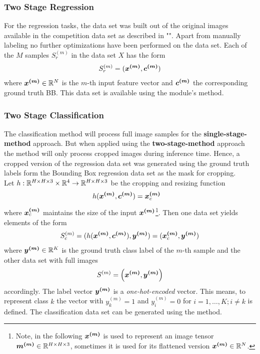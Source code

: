 \subsubsection{Two Stage Regression}
For the regression tasks, the data set was built out of the original images available in the  competition data set as described in "".
Apart from manually labeling no further optimizations have been performed on the data set.
Each of the $M$ samples $S_r^{(m)}$ in the data set $X$ has the form
\begin{align}
    S^{(m)}_r = (\bm{x^{(m)}}, \bm{c^{(m)}})
    \label{eq:regression-sample}
\end{align}
where $\bm{x^{(m)}}\in \mathbb{R}^N$ is the $m$-th input feature vector and $\bm{c^{(m)}}$ the corresponding ground truth BB.
This data set is available using the module's  method.
\subsubsection{Two Stage Classification}
The classification method will process full image samples for the \textbf{single-stage-method} approach.
But when applied using the \textbf{two-stage-method} approach the method will only process cropped images during inference time.
Hence, a cropped version of the regression data set was generated using the ground truth labels form the Bounding Box regression data set as the mask for cropping.\\
Let $h: \mathbb{R}^{H\times H\times 3} \times \mathbb{R}^{4} \rightarrow \mathbb{R}^{H\times H\times 3}$ be the cropping and resizing function
\begin{align}
    h(\bm{x^{(m)}}, \bm{c^{(m)}}) = \bm{x^{(m)}}_c\quad
    \label{eq:crop}
\end{align}
where $\bm{x^{(m)}}_c$ maintains the size of the input $\bm{x^{(m)}}$\footnote{
    Note, in the following $\bm{x^{(m)}}$ is used to represent an image tensor $\bm{m^{(m)}}\in\mathbb{R}^{H\times H\times 3}$, sometimes it is used for its flattened version $\bm{x^{(m)}}\in\mathbb{R}^{N}$.
}.
Then one data set yields elements of the form
\begin{align}
    S^{(m)}_c = (h(\bm{x^{(m)}}, \bm{c^{(m)}}), \bm{y^{(m)}}) = (\bm{x^{(m)}}_c, \bm{y^{(m)}})
    \label{eq:cropped-sample}
\end{align}
where $\bm{y^{(m)}}\in \mathbb{R}^K$ is the ground truth class label of the $m$-th sample and the other data set with full images
\begin{align}
    S^{(m)} = \left(\bm{x^{(m)}}, \bm{y^{(m)}}\right)
    \label{eq:classification-sample}
\end{align}
accordingly.
The label vector $\bm{y^{(m)}}$ is a \textit{one-hot-encoded} vector.
This means, to represent class $k$ the vector with $y^{(m)}_k = 1$ and $y^{(m)}_i = 0$ for $i=1,\ldots,K; i\neq k$ is defined.
The classification data set can be generated using the  method.
